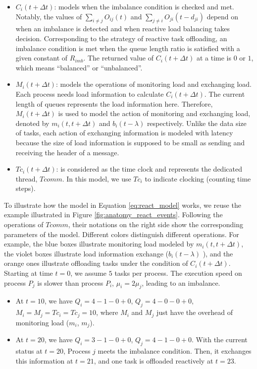 \begin{itemize}
	\item $C_{i}(t + \Delta t)$: models when the imbalance condition is checked and met. Notably, the values of $\sum_{i \neq j} O_{ij}(t)$ and $\sum_{j \neq i} O_{ji}(t - d_{ji})$ depend on when an imbalance is detected and when reactive load balancing takes decision. Corresponding to the strategy of reactive task offloading, an imbalance condition is met when the queue length ratio is satisfied with a given constant of $R_{imb}$. The returned value of $C_{i}(t + \Delta t)$ at a time is $0$ or $1$, which means ``balanced'' or ``unbalanced''.
	
	\item $M_{i}(t + \Delta t)$: models the operations of monitoring load and exchanging load. Each process needs load information to calculate $C_{i}(t + \Delta t)$. The current length of queues represents the load information here. Therefore, $M_{i}(t + \Delta t)$ is used to model the action of monitoring and exchanging load, denoted by $m_{i}(t, t+\Delta t)$ and $b_{i}(t - \lambda)$ respectively. Unlike the data size of tasks, each action of exchanging information is modeled with latency because the size of load information is supposed to be small as sending and receiving the header of a message.
	
	\item $Tc_{i}(t + \Delta t)$: is considered as the time clock and represents the dedicated thread, $Tcomm$. In this model, we use $Tc_{i}$ to indicate clocking (counting time steps).
	
\end{itemize}

\noindent To illustrate how the model in Equation \ref{eq:react_model} works, we reuse the example illustrated in Figure \ref{fig:anatomy_react_events}. Following the operations of $Tcomm$, their notations on the right side show the corresponding parameters of the model. Different colors distinguish different operations. For example, the blue boxes illustrate monitoring load modeled by $m_{i}(t, t+\Delta t)$, the violet boxes illustrate load information exchange ($b_{i}(t - \lambda)$ ), and the orange ones illustrate offloading tasks under the condition of $C_{i}(t + \Delta t)$.\\

Starting at time $t = 0$, we assume $5$ tasks per process. The execution speed on process $P_{j}$ is slower than process $P_{i}$, $\mu_{i} = 2 \mu_{j}$, leading to an imbalance.
\begin{itemize}
	\item At $t=10$, we have $Q_{i} = 4 - 1 - 0 + 0$, $Q_{j} = 4 - 0 - 0 + 0$, $M_{i} = M_{j} = Tc_{i} = Tc_{j} = 10$, where $M_{i}$ and $M_{j}$ just have the overhead of monitoring load ($m_{i}$, $m_{j}$). 
	\item At $t=20$, we have $Q_{i} = 3 - 1 - 0 + 0$, $Q_{j} = 4 - 1 - 0 + 0$. With the current status at $t = 20$, Process $j$ meets the imbalance condition. Then, it exchanges this information at $t = 21$, and one task is offloaded reactively at $t = 23$.
\end{itemize}


